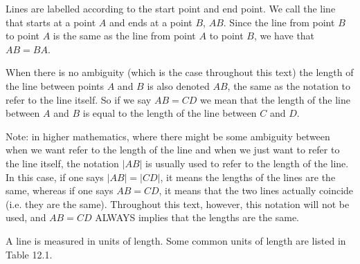 Lines are labelled according to the start point and end point. We call the line that starts at a point $A$ and ends at a point $B$, $AB$. Since the line from point $B$ to point $A$ is the same as the line from point $A$ to point $B$, we have that $AB=BA$.\par 
When there is no ambiguity (which is the case throughout this text) the length of the line between points $A$ and $B$ is also denoted $AB$, the same as the notation to refer to the line itself. So if we say $AB=CD$ we mean that the length of the line between $A$ and $B$ is equal to the length of the line between $C$ and $D$.
\par 
Note: in higher mathematics, where there might be some ambiguity between when we want refer to the length of the line and when we just want to refer to the line itself, the notation $|AB|$ is usually used to refer to the length of the line. In this case, if one says $|AB|=|CD|$, it means the lengths of the lines are the same, whereas if one says $AB=CD$, it means that the two lines actually coincide (i.e. they are the same). Throughout this text, however, this notation will not be used, and $AB=CD$ ALWAYS implies that the lengths are the same. \par A line is measured in units of length. Some common units of length are listed in Table 12.1.\par 
